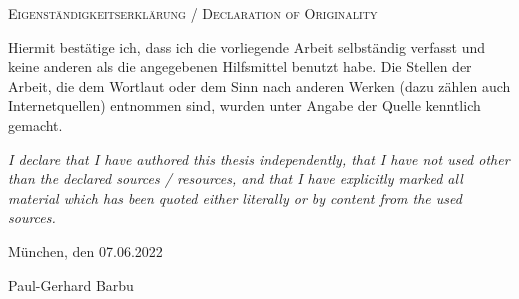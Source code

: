 {
\large
\thispagestyle{empty}
\vspace*{\fill}

\noindent
\textsc{Eigenständigkeitserklärung / Declaration of Originality}

\medskip

\noindent
Hiermit bestätige ich, dass ich die vorliegende Arbeit selbständig verfasst und keine anderen als die angegebenen Hilfsmittel benutzt habe. Die Stellen der Arbeit, die dem Wortlaut oder dem Sinn nach anderen Werken (dazu zählen auch Internetquellen) entnommen sind, wurden unter Angabe der Quelle kenntlich gemacht.

\medskip

\textit{I declare that I have authored this thesis independently, that I have not used other than the declared sources / resources, and that I have explicitly marked all material which has been quoted either literally or by content from the used sources.}

\bigskip

\noindent
München, den 07.06.2022

\vspace*{2cm}

\noindent
Paul-Gerhard Barbu
}

